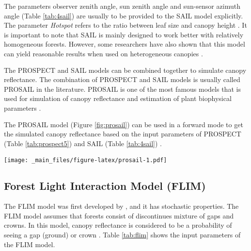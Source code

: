 \documentclass[a4paper, twoside]{templates/ociamthesis}
\let\origfigure\figure
\let\endorigfigure\endfigure
\renewenvironment{figure}[1][2] {
    \expandafter\origfigure\expandafter[H]
} {
    \endorigfigure
}
\begin{document}
The parameters observer zenith angle, sun zenith angle and sun-sensor azimuth angle (Table \ref{tab:4sail}) are usually to be provided to the SAIL model explicitly. The parameter \emph{Hotspot} refers to the ratio between leaf size and canopy height \citep{berger2018evaluation}. It is important to note that SAIL is mainly designed to work better with relatively homogeneous forests. However, some researchers have also shown that this model can yield reasonable results when used on heterogeneous canopies \citep{jay2017retrieving}.

The PROSPECT and SAIL models can be combined together to simulate canopy reflectance. The combination of PROSPECT and SAIL models is usually called PROSAIL in the literature. PROSAIL is one of the most famous models that is used for simulation of canopy reflectance and estimation of plant biophysical parameters \citep{berger2018evaluation, jay2017retrieving}.

The PROSAIL model (Figure \ref{fig:prosail}) can be used in a forward mode to get the simulated canopy reflectance based on the input parameters of PROSPECT (Table \ref{tab:prospect5}) and SAIL (Table \ref{tab:4sail}) \citep{berger2018evaluation}.

\begin{figure}
\centering
\texttt{[image: \_main\_files/figure-latex/prosail-1.pdf]}
\caption{\label{fig:prosail}Diagram of PROSAIL as a combination of PROSPECT5 and 4SAIL in the forward mode}
\end{figure}

\hypertarget{flim}{%
\subsection{Forest Light Interaction Model (FLIM)}\label{flim}}

The FLIM model was first developed by \citet{rosema1992new}, and it has stochastic properties. The FLIM model assumes that forests consist of discontinues mixture of gaps and crowns. In this model, canopy reflectance is considered to be a probability of seeing a gap (ground) or crown \citep{rosema1992new}. Table \ref{tab:flim} shows the input parameters of the FLIM model.
\end{document}
